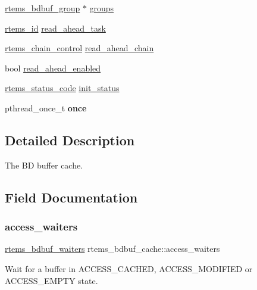 \begin{DoxyCompactItemize}
\mbox{\hyperlink{structrtems__bdbuf__group}{rtems\+\_\+bdbuf\+\_\+group}} $\ast$ \mbox{\hyperlink{structrtems__bdbuf__cache_abd941ed16712eff7a4572eb1c9ee245f}{groups}}
\item 
\mbox{\hyperlink{group__ClassicTasks_gab20892b814dced7dd4e5b9bf42becd57}{rtems\+\_\+id}} \mbox{\hyperlink{structrtems__bdbuf__cache_a66aeb87e41709c60a578934f8e260e13}{read\+\_\+ahead\+\_\+task}}
\item 
\mbox{\hyperlink{unionChain__Control}{rtems\+\_\+chain\+\_\+control}} \mbox{\hyperlink{structrtems__bdbuf__cache_a425d1a5ee4a3c0a0ab5663ff3b9e27c0}{read\+\_\+ahead\+\_\+chain}}
\item 
bool \mbox{\hyperlink{structrtems__bdbuf__cache_addc44cd99fd18d9f00e24bda374d89b1}{read\+\_\+ahead\+\_\+enabled}}
\item 
\mbox{\hyperlink{group__ClassicStatus_ga545d41846817eaba6143d52ee4d9e9fe}{rtems\+\_\+status\+\_\+code}} \mbox{\hyperlink{structrtems__bdbuf__cache_aa7e5756fa73e89e0f27de2534888e636}{init\+\_\+status}}
\item 
\mbox{\label{structrtems__bdbuf__cache_a15c73c4b634e62b939457bf8c768e795}} 
pthread\+\_\+once\+\_\+t {\bfseries once}
\end{DoxyCompactItemize}


\subsection{Detailed Description}
The BD buffer cache. 

\subsection{Field Documentation}
\mbox{\label{structrtems__bdbuf__cache_a57d4ce83f1e7aef1478c86e47565f912}} 
\subsubsection{\texorpdfstring{access\_waiters}{access\_waiters}}
{\footnotesize\ttfamily \mbox{\hyperlink{structrtems__bdbuf__waiters}{rtems\+\_\+bdbuf\+\_\+waiters}} rtems\+\_\+bdbuf\+\_\+cache\+::access\+\_\+waiters}

Wait for a buffer in A\+C\+C\+E\+S\+S\+\_\+\+C\+A\+C\+H\+ED, A\+C\+C\+E\+S\+S\+\_\+\+M\+O\+D\+I\+F\+I\+ED or A\+C\+C\+E\+S\+S\+\_\+\+E\+M\+P\+TY state. \mbox{\label{structrtems__bdbuf__cache_add99c1bac7978bf7713175a6542d0bc2}} 
